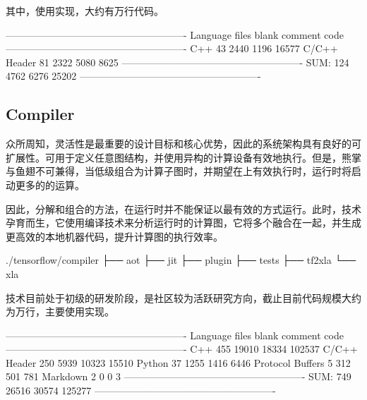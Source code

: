 \begin{content}
其中，使用实现，大约有万行代码。

\begin{leftbar}
\begin{python}[caption={StreamExecutor代码统计}]
-------------------------------------------------------
Language            files     blank   comment      code
-------------------------------------------------------
C++                    43      2440      1196     16577
C/C++ Header           81      2322      5080      8625
-------------------------------------------------------
SUM:                  124      4762      6276     25202
-------------------------------------------------------
\end{python}
\end{leftbar}

\subsection{Compiler}

众所周知，灵活性是\tf{}最重要的设计目标和核心优势，因此\tf{}的系统架构具有良好的可扩展性。\tf{}可用于定义任意图结构，并使用异构的计算设备有效地执行。但是，熊掌与鱼翅不可兼得，当低级组合为计算子图时，并期望在上有效执行时，运行时将启动更多的的运算。

因此，\tf{}分解和组合的方法，在运行时并不能保证以最有效的方式运行。此时，技术孕育而生，它使用编译技术来分析运行时的计算图，它将多个融合在一起，并生成更高效的本地机器代码，提升计算图的执行效率。

\begin{leftbar}
\begin{python}[caption={Compiler源码结构}]
./tensorflow/compiler
├── aot
├── jit
├── plugin
├── tests
├── tf2xla
└── xla
\end{python}
\end{leftbar}

技术目前处于初级的研发阶段，是\tf{}社区较为活跃研究方向，截止目前代码规模大约为万行，主要使用实现。

\begin{leftbar}
\begin{python}[caption={Compiler代码统计}]
-------------------------------------------------------
Language            files     blank   comment      code
-------------------------------------------------------
C++                   455     19010     18334    102537
C/C++ Header          250      5939     10323     15510
Python                 37      1255      1416      6446
Protocol Buffers        5       312       501       781
Markdown                2         0         0         3
-------------------------------------------------------
SUM:                  749     26516     30574    125277
-------------------------------------------------------
\end{python}
\end{leftbar}

\end{content}

